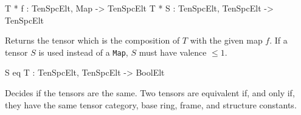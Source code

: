 \begin{intrinsics}
T * f : TenSpcElt, Map -> TenSpcElt
T * S : TenSpcElt, TenSpcElt -> TenSpcElt
\end{intrinsics}

Returns the tensor which is the composition of $T$ with the given map $f$.
If a tensor $S$ is used instead of a {\tt Map}, $S$ must have valence $\leq 1$. 

\begin{intrinsics}
S eq T : TenSpcElt, TenSpcElt -> BoolElt
\end{intrinsics}

Decides if the tensors are the same. 
Two tensors are equivalent if, and only if, they have the same tensor category, base ring, frame, and structure constants. 

